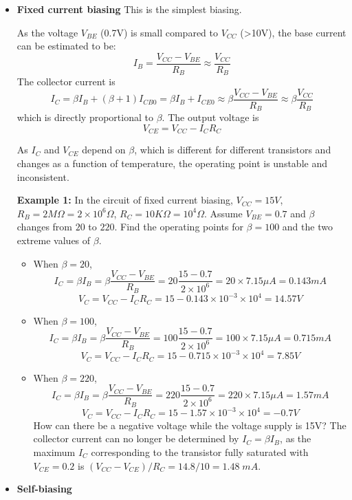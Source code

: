 \begin{itemize}
\item {\bf Fixed current biasing} This is the simplest biasing. 

	As the voltage $V_{BE}$ (0.7V) is small compared to $V_{CC}$ (>10V),
	the base current can be estimated to be:
\[	I_B=\frac{V_{CC}-V_{BE}}{R_B} \approx \frac{V_{CC}}{R_B}	\]
	The collector current is
\[	I_C=\beta I_B+(\beta+1)I_{CB0}=\beta I_B+I_{CE0}
	\approx \beta \frac{V_{CC}-V_{BE}}{R_B} \approx \beta \frac{V_{CC}}{R_B}
\]
which is directly proportional to $\beta$. The output voltage is 
\[	V_{CE}=V_{CC}-I_C R_C	\]

As $I_C$ and $V_{CE}$ depend on $\beta$, which is different for different
transistors and changes as a function of temperature, the operating point 
is unstable and inconsistent. 

{\bf Example 1:} In the circuit of fixed current biasing, $V_{CC}=15V$,
$R_B=2M\Omega=2\times 10^6\Omega$, $R_C=10K\Omega=10^4\Omega$. Assume 
$V_{BE}=0.7$ and $\beta$ changes from $20$ to $220$. Find the operating
points for $\beta=100$ and the two extreme values of $\beta$.

\begin{itemize}

\item When $\beta=20$,
\[ I_C=\beta I_B=\beta \frac{V_{CC}-V_{BE}}{R_B}=
	20 \frac{15-0.7}{2\times 10^6}=20\times 7.15 \mu A=0.143 mA \]
\[ V_C=V_{CC}-I_CR_C=15-0.143\times 10^{-3} \times 10^4=14.57 V	\]

\item When $\beta=100$, 
\[ I_C=\beta I_B=\beta \frac{V_{CC}-V_{BE}}{R_B}=
	100 \frac{15-0.7}{2\times 10^6}=100\times 7.15 \mu A=0.715 mA \]
\[ V_C=V_{CC}-I_CR_C=15-0.715\times 10^{-3} \times 10^4=7.85 V	\]

\item When $\beta=220$,
\[ I_C=\beta I_B=\beta \frac{V_{CC}-V_{BE}}{R_B}=
	220 \frac{15-0.7}{2\times 10^6}=220\times 7.15 \mu A=1.57mA \]
\[ V_C=V_{CC}-I_CR_C=15-1.57\times 10^{-3} \times 10^4=-0.7 V	\]
How can there be a negative voltage while the voltage supply is 15V?
The collector current can no longer be determined by $I_C=\beta I_B$,
as the maximum $I_C$ corresponding to the transistor fully saturated
with $V_{CE}=0.2$ is $(V_{CC}-V_{CE})/R_C=14.8/10=1.48\;mA$. 

\end{itemize}

\item {\bf Self-biasing} 


\end{itemize}
